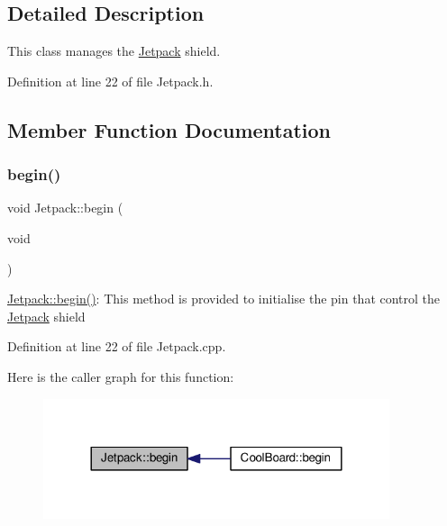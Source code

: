 \subsection{Detailed Description}
This class manages the \hyperlink{class_jetpack}{Jetpack} shield. 

Definition at line 22 of file Jetpack.\+h.



\subsection{Member Function Documentation}
\mbox{\label{class_jetpack_a5a53e1ebf7aaf3bf3e0d37ea64ca09a7}} 
\subsubsection{\texorpdfstring{begin()}{begin()}}
{\footnotesize\ttfamily void Jetpack\+::begin (\begin{DoxyParamCaption}\item[{void}]{ }\end{DoxyParamCaption})}

\hyperlink{class_jetpack_a5a53e1ebf7aaf3bf3e0d37ea64ca09a7}{Jetpack\+::begin()}\+: This method is provided to initialise the pin that control the \hyperlink{class_jetpack}{Jetpack} shield 

Definition at line 22 of file Jetpack.\+cpp.

Here is the caller graph for this function\+:
\nopagebreak
\begin{figure}[H]
\begin{center}
\leavevmode
\includegraphics[width=288pt]{df/d1d/class_jetpack_a5a53e1ebf7aaf3bf3e0d37ea64ca09a7_icgraph}
\end{center}
\end{figure}
\mbox{\label{class_jetpack_ab065ee83e244265a2223a22f3ee4a719}} 
